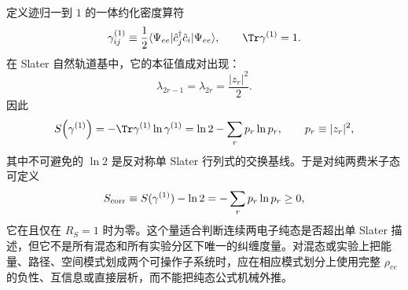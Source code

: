 定义迹归一到 $1$ 的一体约化密度算符
\begin{equation}
{
\gamma^{(1)}_{ij}
\equiv
\frac12\langle\Psi_{ee}|\hat c_j^\dagger\hat c_i|\Psi_{ee}\rangle,
\qquad
\Tr\gamma^{(1)}=1.}
\label{eq:two_fermion_normalized_one_body_rdm}
\end{equation}
在 Slater 自然轨道基中，它的本征值成对出现：
\[
\lambda_{2r-1}=\lambda_{2r}=\frac{|z_r|^2}{2}.
\]
因此
\begin{equation}
{
S\!\left(\gamma^{(1)}\right)
=-\Tr\gamma^{(1)}\ln\gamma^{(1)}
=\ln2-\sum_r p_r\ln p_r,
\qquad p_r\equiv|z_r|^2,}
\label{eq:two_fermion_one_body_entropy_slater}
\end{equation}
其中不可避免的 $\ln2$ 是反对称单 Slater 行列式的交换基线。于是对纯两费米子态可定义
\begin{equation}
{
S_{\rm corr}
\equiv S(\gamma^{(1)})-\ln2
=-\sum_r p_r\ln p_r\ge0,}
\label{eq:two_fermion_correlation_entropy}
\end{equation}
它在且仅在 $R_S=1$ 时为零。这个量适合判断连续两电子纯态是否超出单 Slater 描述，但它不是所有混态和所有实验分区下唯一的纠缠度量。对混态或实验上把能量、路径、空间模式划成两个可操作子系统时，应在相应模式划分上使用完整 $\rho_{ee}$ 的负性、互信息或直接层析，而不能把纯态公式机械外推。

